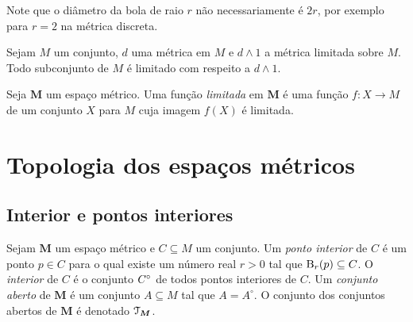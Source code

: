 Note que o diâmetro da bola de raio $r$ não necessariamente é $2r$, por exemplo para $r=2$ na métrica discreta.

\begin{exercise}
Sejam $M$ um conjunto, $d$ uma métrica em $M$ e $d \wedge 1$ a métrica limitada sobre $M$. Todo subconjunto de $M$ é limitado com respeito a $d \wedge 1$.
\end{exercise}

\begin{definition}
Seja $\bm M$ um espaço métrico. Uma função \emph{limitada} em $\bm M$ é uma função $f\colon X \to M$ de um conjunto $X$ para $M$ cuja imagem $f(X)$ é limitada.
\end{definition}

\section{Topologia dos espaços métricos}

\subsection{Interior e pontos interiores}

\begin{definition}
Sejam $\bm M$ um espaço métrico e $C \subseteq M$ um conjunto. Um \emph{ponto interior} de $C$ é um ponto $p \in C$ para o qual existe um número real $r > 0$ tal que $\mathrm{B}_r(p) \subseteq C$. O \emph{interior} de $C$ é o conjunto ${C}^\circ$ de todos pontos interiores de $C$. Um \emph{conjunto aberto} de $\bm M$ é um conjunto $A \subseteq M$ tal que $A = A^\circ$. O conjunto dos conjuntos abertos de $\bm M$ é denotado $\mathcal{T}_{\bm M}$.
\end{definition}

